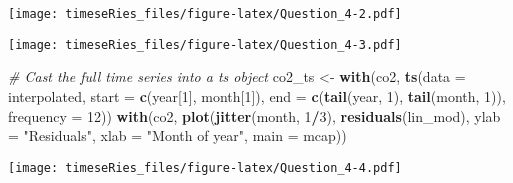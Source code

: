 \documentclass[]{book}
\newenvironment{Shaded}{\begin{snugshade}}{\end{snugshade}}
\newcommand{\KeywordTok}[1]{\textcolor[rgb]{0.13,0.29,0.53}{\textbf{#1}}}
\newcommand{\DataTypeTok}[1]{\textcolor[rgb]{0.13,0.29,0.53}{#1}}
\newcommand{\DecValTok}[1]{\textcolor[rgb]{0.00,0.00,0.81}{#1}}
\newcommand{\StringTok}[1]{\textcolor[rgb]{0.31,0.60,0.02}{#1}}
\newcommand{\CommentTok}[1]{\textcolor[rgb]{0.56,0.35,0.01}{\textit{#1}}}
\newcommand{\OperatorTok}[1]{\textcolor[rgb]{0.81,0.36,0.00}{\textbf{#1}}}
\newcommand{\NormalTok}[1]{#1}
\begin{document}
\texttt{[image: timeseRies\_files/figure-latex/Question\_4-2.pdf]}

\begin{Shaded}
\end{Shaded}

\texttt{[image: timeseRies\_files/figure-latex/Question\_4-3.pdf]}

\begin{Shaded}
\begin{Highlighting}[]
\CommentTok{# Cast the full time series into a ts object}
\NormalTok{co2_ts <-}\StringTok{ }\KeywordTok{with}\NormalTok{(co2, }\KeywordTok{ts}\NormalTok{(}\DataTypeTok{data =}\NormalTok{ interpolated, }\DataTypeTok{start =} \KeywordTok{c}\NormalTok{(year[}\DecValTok{1}\NormalTok{], month[}\DecValTok{1}\NormalTok{]), }\DataTypeTok{end =} \KeywordTok{c}\NormalTok{(}\KeywordTok{tail}\NormalTok{(year, }
    \DecValTok{1}\NormalTok{), }\KeywordTok{tail}\NormalTok{(month, }\DecValTok{1}\NormalTok{)), }\DataTypeTok{frequency =} \DecValTok{12}\NormalTok{))}
\KeywordTok{with}\NormalTok{(co2, }\KeywordTok{plot}\NormalTok{(}\KeywordTok{jitter}\NormalTok{(month, }\DecValTok{1}\OperatorTok{/}\DecValTok{3}\NormalTok{), }\KeywordTok{residuals}\NormalTok{(lin_mod), }\DataTypeTok{ylab =} \StringTok{"Residuals"}\NormalTok{, }\DataTypeTok{xlab =} \StringTok{"Month of year"}\NormalTok{, }
    \DataTypeTok{main =}\NormalTok{ mcap))}
\end{Highlighting}
\end{Shaded}

\texttt{[image: timeseRies\_files/figure-latex/Question\_4-4.pdf]}
\end{document}
